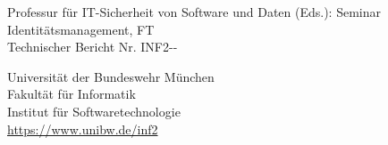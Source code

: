 \thispagestyle{empty}
         

\vspace*{18cm}
Professur für IT-Sicherheit von Software und Daten (Eds.): Seminar Identitätsmanagement, FT \the\year{}\\
Technischer Bericht Nr. INF2-\the\year{}-\the\month{}

Universit\"at der Bundeswehr M\"unchen\\
Fakult\"at f\"ur Informatik\\
Institut f\"ur Softwaretechnologie\\
\url{https://www.unibw.de/inf2}
